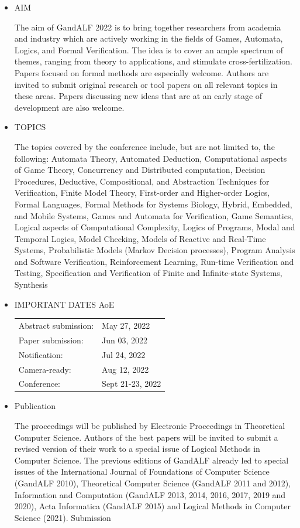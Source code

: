 \documentclass[prodmode,acmtecs]{acmsmall} %
\begin{document}
\begin{itemize}\item  AIM 
 
  The aim of GandALF 2022 is to bring together researchers from academia and industry which are actively working in the fields of Games, Automata, Logics, and Formal Verification. The idea is to cover an ample spectrum of themes, ranging from theory to applications, and stimulate cross-fertilization. Papers focused on formal methods are especially welcome. Authors are invited to submit original research or tool papers on all relevant topics in these areas. Papers discussing new ideas that are at an early stage of development are also welcome.  
 
\item  TOPICS 
 
  The topics covered by the conference include, but are not limited to, the following: Automata Theory, Automated Deduction, Computational aspects of Game Theory, Concurrency and Distributed computation, Decision Procedures, Deductive, Compositional, and Abstraction Techniques for Verification, Finite Model Theory, First-order and Higher-order Logics, Formal Languages, Formal Methods for Systems Biology, Hybrid, Embedded, and Mobile Systems, Games and Automata for Verification, Game Semantics, Logical aspects of Computational Complexity, Logics of Programs, Modal and Temporal Logics, Model Checking, Models of Reactive and Real-Time Systems, Probabilistic Models (Markov Decision processes), Program Analysis and Software Verification, Reinforcement Learning, Run-time Verification and Testing, Specification and Verification of Finite and Infinite-state Systems, Synthesis 
 
\item  IMPORTANT DATES AoE 
 
\begin{tabulary}{\linewidth}{LL}Abstract submission:  & May 27, 2022 \\
Paper submission:  & Jun 03, 2022 \\
Notification:  & Jul 24, 2022 \\
Camera-ready:  & Aug 12, 2022 \\
Conference:  & Sept 21-23, 2022 \\
\end{tabulary}
 
\item  Publication 
 
  The proceedings will be published by Electronic Proceedings in Theoretical Computer Science. Authors of the best papers will be invited to submit a revised version of their work to a special issue of Logical Methods in Computer Science. The previous editions of GandALF already led to special issues of the International Journal of Foundations of Computer Science (GandALF 2010), Theoretical Computer Science (GandALF 2011 and 2012), Information and Computation (GandALF 2013, 2014, 2016, 2017, 2019 and 2020), Acta Informatica (GandALF 2015) and Logical Methods in Computer Science (2021). Submission 
 

\end{itemize}
\end{document}
